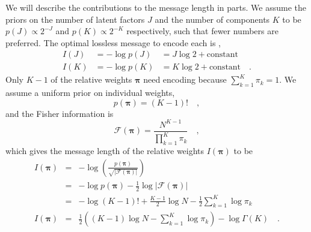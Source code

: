 \documentclass[twocolumn]{aastex62}
\newcommand{\vect}[1]{\boldsymbol{\mathbf{#1}}}
\renewcommand{\vec}[1]{\vect{#1}}
\newcommand{\weight}{\pi}
\newcommand{\NumData}{N}
\newcommand{\NumLatentFactors}{J}
\newcommand{\NumComponents}{K}
\newcommand{\numcomponents}{k}
\begin{document}
We will describe the contributions to the message length in parts. We assume
the priors on the number of latent factors $\NumLatentFactors$ and the
number of components $\NumComponents$ to be
$p(\NumLatentFactors) \propto 2^{-\NumLatentFactors}$ and
$p(\NumComponents) \propto 2^{-\NumComponents}$ respectively,
such that fewer numbers are preferred. The optimal lossless message to 
encode each is \citep[Sec. 6.8.2;][]{Knorr-Held:2000},
\begin{eqnarray}
	I(\NumLatentFactors) &= -\log{p(\NumLatentFactors)} &= \NumLatentFactors\log{2} + \textrm{constant} \label{eq:prior_J} \\
	I(\NumComponents) &= -\log{p(\NumComponents)} &= \NumComponents\log{2} + \textrm{constant} \label{eq:prior_K} \quad .
\end{eqnarray}
Only $\NumComponents - 1$ of the relative weights $\vec\weight$ need encoding because 
$\sum_{\numcomponents=1}^{\NumComponents}\weight_\numcomponents = 1$. We assume a uniform prior on 
individual weights,
\begin{equation}
	p(\vec\weight) = (\NumComponents - 1)! \quad ,
\end{equation}
\noindent{}and the Fisher information is
\begin{equation}
	\mathcal{F}(\vec\weight) = \frac{\NumData^{\NumComponents - 1}}{\prod_{\numcomponents=1}^{\NumComponents}\weight_\numcomponents} \quad ,
\end{equation}
\noindent{}which gives the message length of the relative weights $I(\vec\weight)$ to be
\begin{eqnarray}
	I(\vec\weight) &=& -\log\left(\frac{p(\vec\weight)}{\sqrt{|\mathcal{F}(\vec\weight)|}}\right) \nonumber \\
			   &=& -\log{p(\vec\weight)} - \frac{1}{2}\log{|\mathcal{F}(\vec\weight)|} \nonumber  \\
			   &=& -\log(\NumComponents - 1)! + \frac{\NumComponents - 1}{2}\log{\NumData} - \frac{1}{2}\sum_{\numcomponents=1}^{\NumComponents}\log\weight_\numcomponents \nonumber \\
	I(\vec\weight) &=& \frac{1}{2}\left(\left(\NumComponents - 1\right)\log\NumData - \sum_{\numcomponents=1}^{\NumComponents}\log\weight_\numcomponents\right) -\log\Gamma(\NumComponents) \quad . \nonumber \label{eq:prior_pi} \\
\end{eqnarray}
\end{document}
